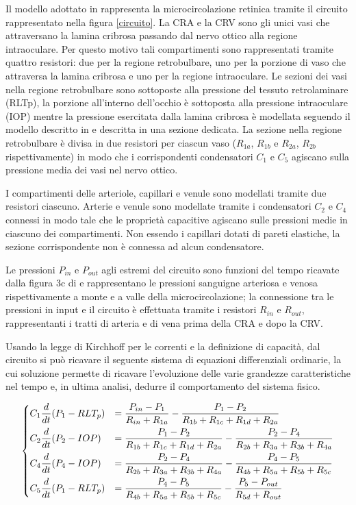\documentclass{article}
\begin{document}
Il modello adottato in \cite{art1} rappresenta la microcircolazione retinica tramite il circuito rappresentato nella figura \ref{circuito}.
La CRA e la CRV sono gli unici vasi che attraversano la lamina cribrosa passando dal nervo ottico alla regione intraoculare.
Per questo motivo tali compartimenti sono rappresentati tramite quattro resistori: due per la regione retrobulbare, uno per la porzione di vaso che attraversa la lamina cribrosa e uno per la regione intraoculare.
Le sezioni dei vasi nella regione retrobulbare sono sottoposte alla pressione del tessuto retrolaminare (RLTp), la porzione all'interno dell'occhio è sottoposta alla pressione intraoculare (IOP) mentre la pressione esercitata dalla lamina cribrosa è modellata seguendo il modello descritto in \cite{art3} e descritta in una sezione dedicata.
La sezione nella regione retrobulbare è divisa in due resistori per ciascun vaso ($R_{1a}$, $R_{1b}$ e $R_{2a}$, $R_{2b}$ rispettivamente) in modo che i corrispondenti condensatori $C_1$ e $C_5$ agiscano sulla pressione media dei vasi nel nervo ottico.

I compartimenti delle arteriole, capillari e venule sono modellati tramite due resistori ciascuno.
Arterie e venule sono modellate tramite i condensatori $C_2$ e $C_4$ connessi in modo tale che le proprietà capacitive agiscano sulle pressioni medie in ciascuno dei compartimenti.
Non essendo i capillari dotati di pareti elastiche, la sezione corrispondente non è connessa ad alcun condensatore.

Le pressioni $P_{in}$ e $P_{out}$ agli estremi del circuito sono funzioni del tempo  ricavate dalla figura 3c di \cite{art1} e rappresentano le pressioni sanguigne arteriosa e venosa rispettivamente a monte e a valle della microcircolazione; la connessione tra le pressioni in input e il circuito è effettuata tramite i resistori $R_{in}$ e $R_{out}$, rappresentanti i tratti di arteria e di vena prima della CRA e dopo la CRV.

Usando la legge di Kirchhoff per le correnti e la definizione di capacità, dal circuito si può ricavare il seguente sistema di equazioni differenziali ordinarie, la cui soluzione permette di ricavare l'evoluzione delle varie grandezze caratteristiche nel tempo e, in ultima analisi, dedurre il comportamento del sistema fisico.

\begin{equation}
\begin{dcases}
  C_1 \frac{d}{dt}(P_1 - RLT_p) &= \frac{P_{in} - P_1}{R_{in} + R_{1a}}  - \frac{P_1 - P_2}{R_{1b} + R_{1c} + R_{1d} + R_{2a}} \\
  C_2 \frac{d}{dt}(P_2 - IOP) &= \frac{P_1 - P_2}{R_{1b} + R_{1c} + R_{1d} + R_{2a}}  - \frac{P_2 - P_4}{R_{2b} + R_{3a} + R_{3b} + R_{4a}} \\
  C_4 \frac{d}{dt}(P_4 - IOP) &= \frac{P_2 - P_4}{R_{2b} + R_{3a} + R_{3b} + R_{4a}}  - \frac{P_4 - P_5}{R_{4b} + R_{5a} + R_{5b} + R_{5c}} \\
  C_5 \frac{d}{dt}(P_1 - RLT_p) &= \frac{P_4 - P_5}{R_{4b} + R_{5a} + R_{5b} + R_{5c}}  - \frac{P_5 - P_{out}}{R_{5d} + R_{out}}
\end{dcases}
\label{sistema}
\end{equation}
\end{document}
